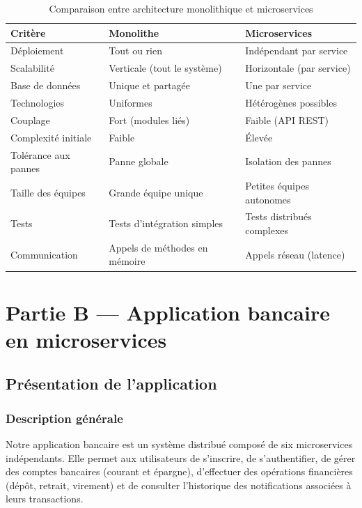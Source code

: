 \documentclass[12pt,a4paper]{article}
\begin{document}
\begin{table}[H]
\centering
\caption{Comparaison entre architecture monolithique et microservices}
\label{tab:comparaison}
\begin{tabularx}{\textwidth}{|l|X|X|}
\hline
\textbf{Critère} & \textbf{Monolithe} & \textbf{Microservices} \\
\hline
Déploiement & Tout ou rien & Indépendant par service \\
\hline
Scalabilité & Verticale (tout le système) & Horizontale (par service) \\
\hline
Base de données & Unique et partagée & Une par service \\
\hline
Technologies & Uniformes & Hétérogènes possibles \\
\hline
Couplage & Fort (modules liés) & Faible (API REST) \\
\hline
Complexité initiale & Faible & Élevée \\
\hline
Tolérance aux pannes & Panne globale & Isolation des pannes \\
\hline
Taille des équipes & Grande équipe unique & Petites équipes autonomes \\
\hline
Tests & Tests d'intégration simples & Tests distribués complexes \\
\hline
Communication & Appels de méthodes en mémoire & Appels réseau (latence) \\
\hline
\end{tabularx}
\end{table}


\section{Partie B --- Application bancaire en microservices}
\label{sec:partieB}

\subsection{Présentation de l'application}

\subsubsection{Description générale}

Notre application bancaire est un système distribué composé de six microservices indépendants. Elle permet aux utilisateurs de s'inscrire, de s'authentifier, de gérer des comptes bancaires (courant et épargne), d'effectuer des opérations financières (dépôt, retrait, virement) et de consulter l'historique des notifications associées à leurs transactions.
\end{document}

